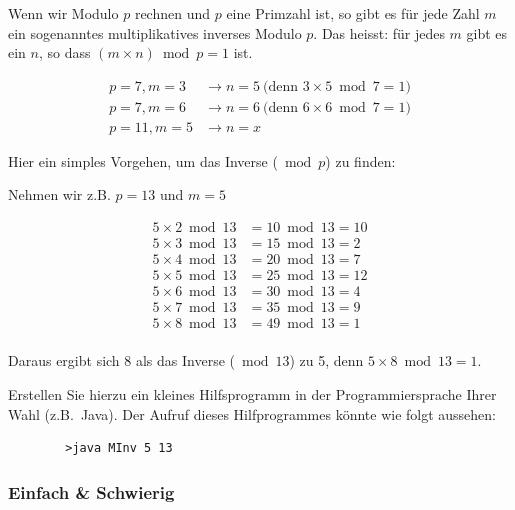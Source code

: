 Wenn wir Modulo $p$ rechnen und $p$ eine Primzahl ist, so gibt es für
jede Zahl $m$ ein sogenanntes multiplikatives inverses Modulo $p$.
Das heisst: für jedes $m$ gibt es ein $n$, so dass $(m\times n) \bmod p = 1$ ist.

\begin{align*}
    p = 7, m = 3 &\rightarrow n = 5~ \text{(denn~} 3\times 5\bmod 7 = 1 \text{)} \\
    p = 7, m = 6 &\rightarrow n = 6~ \text{(denn~} 6\times 6\bmod 7 = 1 \text{)} \\
    p = 11, m = 5 &\rightarrow n = x
\end{align*}

Hier ein simples Vorgehen, um das Inverse ($\bmod p$) zu finden:

Nehmen wir z.B. $p = 13$ und $m = 5$

\begin{align*}
    5 \times 2 \bmod 13 &= 10 \bmod 13 = 10 \\
    5 \times 3 \bmod 13 &= 15 \bmod 13 = 2  \\
    5 \times 4 \bmod 13 &= 20 \bmod 13 = 7  \\
    5 \times 5 \bmod 13 &= 25 \bmod 13 = 12 \\
    5 \times 6 \bmod 13 &= 30 \bmod 13 = 4  \\
    5 \times 7 \bmod 13 &= 35 \bmod 13 = 9  \\
    5 \times 8 \bmod 13 &= 49 \bmod 13 = 1  \\
\end{align*}

Daraus ergibt sich 8 als das Inverse ($\bmod 13$) zu 5,
denn $5\times 8 \bmod 13 = 1$.

\begin{Exercise}[%
title={Inverse Modulo Berechnung},
label={exercise:inverse-modulo}]

    Erstellen Sie hierzu ein kleines Hilfsprogramm in der Programmiersprache
    Ihrer Wahl (z.B.~Java). Der Aufruf dieses Hilfprogrammes könnte wie folgt aussehen:
    \begin{verbatim}
        >java MInv 5 13
    \end{verbatim}
\end{Exercise}

\subsubsection*{Einfach \& Schwierig}
\label{subsubsec:einfach}

